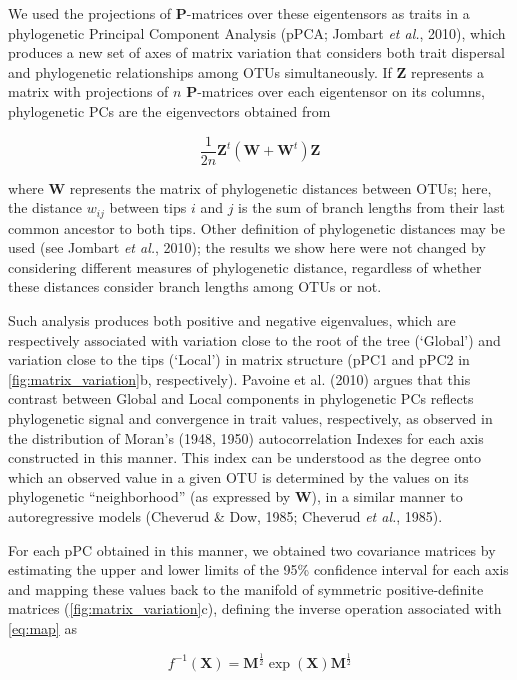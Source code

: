 \documentclass[12pt,twoside]{report}
\begin{document}
We used the projections of $\mathbf{P}$-matrices over these eigentensors
as traits in a phylogenetic Principal Component Analysis (pPCA; Jombart
\emph{et al.}, 2010), which produces a new set of axes of matrix
variation that considers both trait dispersal and phylogenetic
relationships among OTUs simultaneously. If $\mathbf{Z}$ represents a
matrix with projections of $n$ $\mathbf{P}$-matrices over each
eigentensor on its columns, phylogenetic PCs are the eigenvectors
obtained from

\begin{equation}
\frac{1}{2n} \mathbf{Z}^t(\mathbf{W} + \mathbf{W}^t) \mathbf{Z}
\end{equation}

where $\mathbf{W}$ represents the matrix of phylogenetic distances
between OTUs; here, the distance $w_{ij}$ between tips $i$ and $j$ is
the sum of branch lengths from their last common ancestor to both tips.
Other definition of phylogenetic distances may be used (see Jombart
\emph{et al.}, 2010); the results we show here were not changed by
considering different measures of phylogenetic distance, regardless of
whether these distances consider branch lengths among OTUs or not.

Such analysis produces both positive and negative eigenvalues, which are
respectively associated with variation close to the root of the tree
(`Global') and variation close to the tips (`Local') in matrix structure
(pPC1 and pPC2 in \autoref{fig:matrix_variation}b, respectively).
Pavoine et al. (2010) argues that this contrast between Global and Local
components in phylogenetic PCs reflects phylogenetic signal and
convergence in trait values, respectively, as observed in the
distribution of Moran's (1948, 1950) autocorrelation Indexes for each
axis constructed in this manner. This index can be understood as the
degree onto which an observed value in a given OTU is determined by the
values on its phylogenetic ``neighborhood'' (as expressed by
$\mathbf{W}$), in a similar manner to autoregressive models (Cheverud \&
Dow, 1985; Cheverud \emph{et al.}, 1985).

For each pPC obtained in this manner, we obtained two covariance
matrices by estimating the upper and lower limits of the 95\% confidence
interval for each axis and mapping these values back to the manifold of
symmetric positive-definite matrices (\autoref{fig:matrix_variation}c),
defining the inverse operation associated with \autoref{eq:map} as

\begin{equation}
f^{-1}(\mathbf{X}) = \mathbf{M}^{\frac{1}{2}}\exp(\mathbf{X})\mathbf{M}^{\frac{1}{2}}
\label{eq:inv}
\end{equation}
\end{document}
